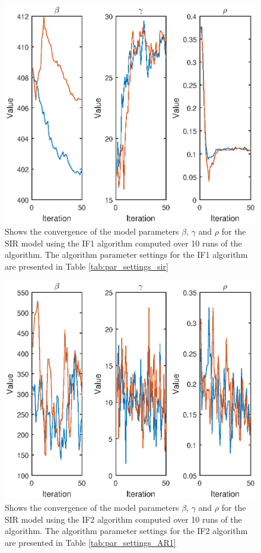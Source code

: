 \documentclass[twoside,openright]{report}
\begin{document}
\begin{figure}[h]
  \centering
    \includegraphics[width=1\textwidth]{./fig_sir/IF1}
  \caption{Shows the convergence of the model parameters $\beta$, $\gamma$ and $\rho$ for the SIR model using the IF1 algorithm computed over 10 runs of the algorithm. The algorithm parameter settings for the IF1 algorithm are presented in Table \ref{tab:par_settings_sir} }
  \label{fig:res_IF1}
\end{figure}

\begin{figure}[h]
  \centering
    \includegraphics[width=1\textwidth]{./fig_sir/IF2}
  \caption{Shows the convergence of the model parameters $\beta$, $\gamma$ and $\rho$ for the SIR model using the IF2 algorithm computed over 10 runs of the algorithm. The algorithm parameter settings for the IF2 algorithm are presented in Table \ref{tab:par_settings_AR1} }
  \label{fig:res_IF2}
\end{figure}
\end{document}
